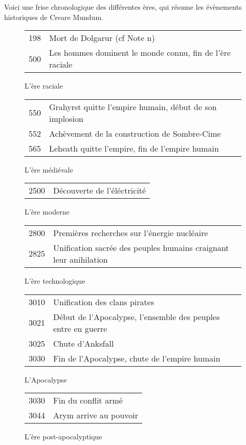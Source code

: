 \renewcommand{\arraystretch}{1.8}

Voici une frise chronologique des différentes ères, qui résume les évènements historiques de Creare Mundum.
\begin{figure}[ht]
\begin{tabular}{r | l}
198 & Mort de Dolgarur (cf Note n\degre236)\\
500 & Les hommes dominent le monde connu, fin de l'ère raciale
\end{tabular}
\caption{L'ère raciale}
\end{figure}

\begin{figure}[ht]
\begin{tabular}{r | l}
550 & Grahyrst quitte l'empire humain, début de son implosion\\
552 & Achèvement de la construction de Sombre-Cime \\
565 & Leheath quitte l'empire, fin de l'empire humain \\
\end{tabular}
\caption{L'ère médiévale}
\end{figure}

\begin{figure}[ht]
\begin{tabular}{r | l}
2500 & Découverte de l'éléctricité
\end{tabular}
\caption{L'ère moderne}
\end{figure}

\begin{figure}[ht]
\begin{tabular}{r | l}
2800 & Premières recherches sur l'énergie nucléaire \\
2825 & Unification sacrée des peuples humains craignant leur anihilation
\end{tabular}
\caption{L'ère technologique}
\end{figure}

\begin{figure}[ht]
\begin{tabular}{r | l}
3010 & Unification des clans pirates\\
3021 & Début de l'Apocalypse, l'ensemble des peuples entre en guerre\\
3025 & Chute d'Anksfall\\
3030 & Fin de l'Apocalypse, chute de l'empire humain
\end{tabular}
\caption{L'Apocalypse}
\end{figure}

\begin{figure}[ht]
\begin{tabular}{r | l}
3030 & Fin du conflit armé\\
3044 & Arym arrive au pouvoir\\
\end{tabular}
\caption{L'ère post-apocalyptique}
\end{figure}